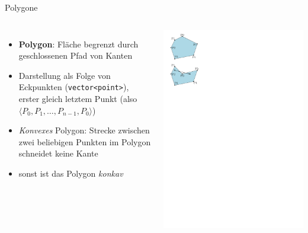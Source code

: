 \begin{frame}{Polygone}
	\begin{columns}
	\begin{itemize}
		\item \textbf{Polygon}: Fläche begrenzt durch geschlossenen Pfad von Kanten
		\item Darstellung als Folge von Eckpunkten (\texttt{vector<point>}), erster gleich letztem Punkt (also $\langle P_0, P_1, \ldots, P_{n-1}, P_0\rangle$)
		\item \emph{Konvexes} Polygon: Strecke zwischen zwei beliebigen Punkten im Polygon schneidet keine Kante
		\item sonst ist das Polygon \emph{konkav}
	\end{itemize}
	\includegraphics[height=.8\textheight,keepaspectratio]{polygon.pdf}
	\end{columns}
\end{frame}

